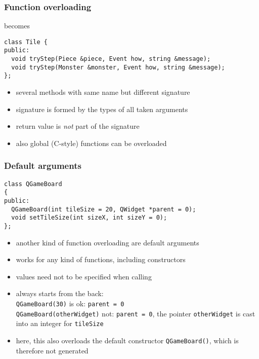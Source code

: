 \documentclass{slides}
\begin{document}
\begin{frame}[fragile]
  \frametitle{Function overloading}
  
  \begin{center}
  \end{center}
  becomes
\begin{lstlisting}
class Tile {
public:
  void tryStep(Piece &piece, Event how, string &message);
  void tryStep(Monster &monster, Event how, string &message);
};
\end{lstlisting}

  \begin{itemize}
  \item several methods with same name but different signature
  \item signature is formed by the types of all taken arguments
  \item return value is \emph{not} part of the signature
  \item also global (C-style) functions can be overloaded
  \end{itemize}
\end{frame}

\begin{frame}[fragile]
  \frametitle{Default arguments}
  
\begin{lstlisting}
class QGameBoard
{
public:
  QGameBoard(int tileSize = 20, QWidget *parent = 0);
  void setTileSize(int sizeX, int sizeY = 0);
};
\end{lstlisting}

  \begin{itemize}
  \item another kind of function overloading are default arguments
  \item works for any kind of functions, including constructors
  \item values need not to be specified when calling
  \item always starts from the back:\\
    \lstinline!QGameBoard(30)! is ok: \lstinline!parent = 0!\\
    \lstinline!QGameBoard(otherWidget)! not:
    \lstinline!parent = 0!, the pointer \lstinline!otherWidget! is cast into an
    integer for \lstinline!tileSize!
  \item here, this also overloads the default constructor
    \lstinline!QGameBoard()!, which is therefore not generated
  \end{itemize}

\end{frame}
\end{document}
